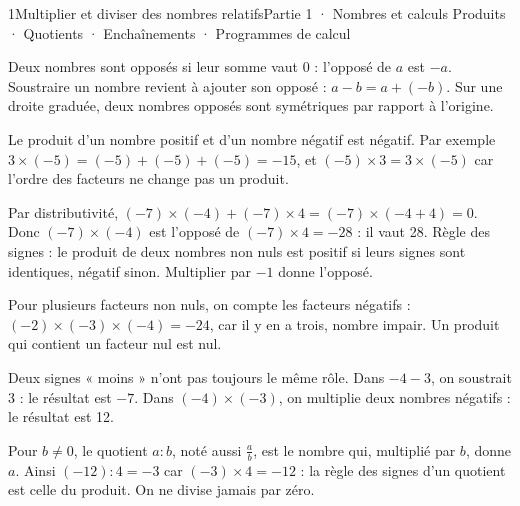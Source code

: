 \begin{ouverture}[calcul]{1}{Multiplier et diviser des nombres relatifs}{Partie 1 · Nombres et calculs}
{Produits · Quotients · Enchaînements · Programmes de calcul}
\end{ouverture}
\pagestyle{otMain}\essentiel\fontsize{11}{15}\selectfont
{}\label{cours-1-1}
\begin{definition}Deux nombres sont opposés si leur somme vaut 0 : l’opposé de $a$ est $-a$. Soustraire un nombre revient à ajouter son opposé : $a-b=a+(-b)$. Sur une droite graduée, deux nombres opposés sont symétriques par rapport à l’origine.\end{definition}
\begin{propriete}Le produit d’un nombre positif et d’un nombre négatif est négatif. Par exemple $3\times(-5)=(-5)+(-5)+(-5)=-15$, et $(-5)\times3=3\times(-5)$ car l’ordre des facteurs ne change pas un produit.\end{propriete}
\begin{propriete}Par distributivité, $(-7)\times(-4)+(-7)\times4=(-7)\times(-4+4)=0$. Donc $(-7)\times(-4)$ est l’opposé de $(-7)\times4=-28$ : il vaut 28. Règle des signes : le produit de deux nombres non nuls est positif si leurs signes sont identiques, négatif sinon. Multiplier par $-1$ donne l’opposé.\end{propriete}
\begin{exemple}Pour plusieurs facteurs non nuls, on compte les facteurs négatifs : $(-2)\times(-3)\times(-4)=-24$, car il y en a trois, nombre impair. Un produit qui contient un facteur nul est nul.\end{exemple}
\begin{attention}Deux signes « moins » n’ont pas toujours le même rôle. Dans $-4-3$, on soustrait 3 : le résultat est $-7$. Dans $(-4)\times(-3)$, on multiplie deux nombres négatifs : le résultat est 12.\end{attention}
\clearpage
{}\label{cours-1-2}
\begin{propriete}Pour $b\ne0$, le quotient $a:b$, noté aussi $\frac ab$, est le nombre qui, multiplié par $b$, donne $a$. Ainsi $(-12):4=-3$ car $(-3)\times4=-12$ : la règle des signes d’un quotient est celle du produit. On ne divise jamais par zéro.\end{propriete}
